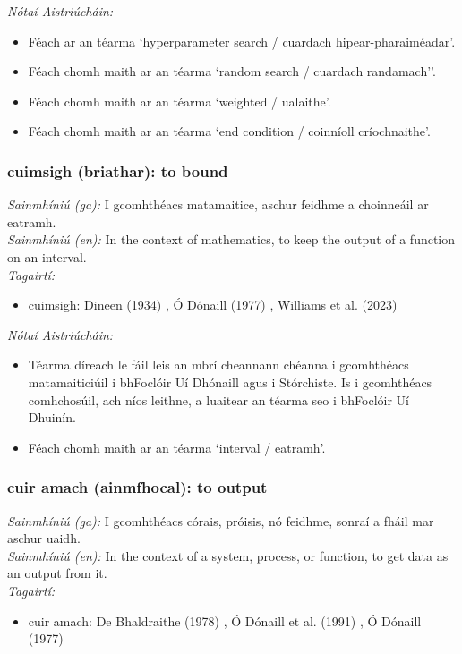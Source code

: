 \documentclass{article}
\begin{document}
 \noindent \textit{Nótaí Aistriúcháin:}
\begin{itemize}
	\item Féach ar an téarma `hyperparameter search / cuardach hipear-pharaiméadar'.
	\item Féach chomh maith ar an téarma `random search / cuardach randamach''.
	\item Féach chomh maith ar an téarma `weighted / ualaithe'.
	\item Féach chomh maith ar an téarma `end condition / coinníoll críochnaithe'.
\end{itemize}


\subsubsection*{cuimsigh (briathar): to bound}
 \noindent \textit{Sainmhíniú (ga):} I gcomhthéacs matamaitice, aschur feidhme a choinneáil ar eatramh.
\\
 \noindent \textit{Sainmhíniú (en):} In the context of mathematics, to keep the output of a function on an interval.
\\
 \noindent \textit{Tagairtí:}
\begin{itemize}
	\item cuimsigh: Dineen (1934) \cite{dineen}, Ó Dónaill (1977) \cite{odonaill}, Williams et al. (2023) \cite{storchiste}
\end{itemize}

 \noindent \textit{Nótaí Aistriúcháin:}
\begin{itemize}
	\item Téarma díreach le fáil leis an mbrí cheannann chéanna i gcomhthéacs matamaiticiúil i bhFoclóir Uí Dhónaill agus i Stórchiste. Is i gcomhthéacs comhchosúil, ach níos leithne, a luaitear an téarma seo i bhFoclóir Uí Dhuinín.
	\item Féach chomh maith ar an téarma `interval / eatramh'.
\end{itemize}


\subsubsection*{cuir amach (ainmfhocal): to output}
 \noindent \textit{Sainmhíniú (ga):} I gcomhthéacs córais, próisis, nó feidhme, sonraí a fháil mar aschur uaidh.
\\
 \noindent \textit{Sainmhíniú (en):} In the context of a system, process, or function, to get data as an output from it.
\\
 \noindent \textit{Tagairtí:}
\begin{itemize}
	\item cuir amach: De Bhaldraithe (1978) \cite{de-bhaldraithe}, Ó Dónaill et al. (1991) \cite{focloir-beag}, Ó Dónaill (1977) \cite{odonaill}
\end{itemize}
\end{document}
